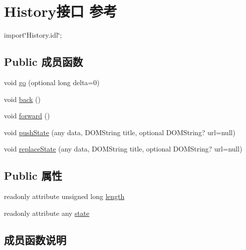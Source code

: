 \hypertarget{interface_history}{}\section{History接口 参考}
\label{interface_history}


{\ttfamily import\char`\"{}History.\+idl\char`\"{};}

\subsection*{Public 成员函数}
\begin{DoxyCompactItemize}
\item 
void \mbox{\hyperlink{interface_history_ae962804635b0bae91b7695a94e5f4f26}{go}} (optional long delta=0)
\item 
void \mbox{\hyperlink{interface_history_ac936de80ad4cafc423fbb66e8fd7c434}{back}} ()
\item 
void \mbox{\hyperlink{interface_history_a7ca8f883833b6c40b5210a0ee5692b57}{forward}} ()
\item 
void \mbox{\hyperlink{interface_history_ad9664de1d61512f87064f6d8d3e6ace1}{push\+State}} (any data, D\+O\+M\+String title, optional D\+O\+M\+String? url=null)
\item 
void \mbox{\hyperlink{interface_history_a1f18439a923e8867500357517cf91f12}{replace\+State}} (any data, D\+O\+M\+String title, optional D\+O\+M\+String? url=null)
\end{DoxyCompactItemize}
\subsection*{Public 属性}
\begin{DoxyCompactItemize}
\item 
readonly attribute unsigned long \mbox{\hyperlink{interface_history_a675d5c5382c9e22e685b52743493b105}{length}}
\item 
readonly attribute any \mbox{\hyperlink{interface_history_a72b4d1c31b1a06e624332850523a337c}{state}}
\end{DoxyCompactItemize}


\subsection{成员函数说明}
\mbox{\label{interface_history_ac936de80ad4cafc423fbb66e8fd7c434}} 
